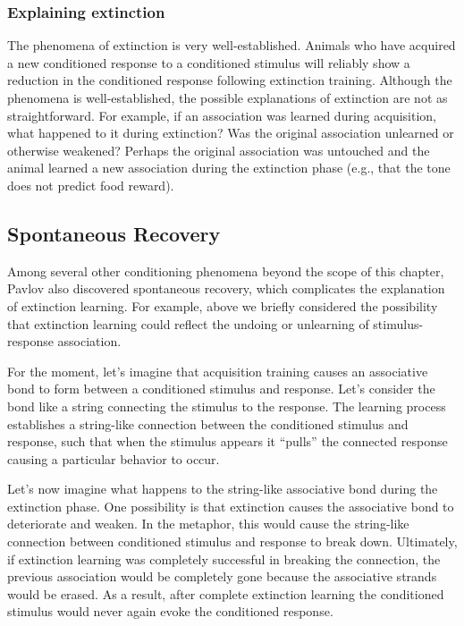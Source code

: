 \documentclass[
  oneside,
  12pt]{crumpbook}
\begin{document}
\hypertarget{explaining-extinction}{%
\subsubsection{Explaining extinction}\label{explaining-extinction}}

The phenomena of extinction is very well-established. Animals who have acquired a new conditioned response to a conditioned stimulus will reliably show a reduction in the conditioned response following extinction training. Although the phenomena is well-established, the possible explanations of extinction are not as straightforward. For example, if an association was learned during acquisition, what happened to it during extinction? Was the original association unlearned or otherwise weakened? Perhaps the original association was untouched and the animal learned a new association during the extinction phase (e.g., that the tone does not predict food reward).

\hypertarget{spontaneous-recovery}{%
\subsection{Spontaneous Recovery}\label{spontaneous-recovery}}

Among several other conditioning phenomena beyond the scope of this chapter, Pavlov also discovered spontaneous recovery, which complicates the explanation of extinction learning. For example, above we briefly considered the possibility that extinction learning could reflect the undoing or unlearning of stimulus-response association.

For the moment, let's imagine that acquisition training causes an associative bond to form between a conditioned stimulus and response. Let's consider the bond like a string connecting the stimulus to the response. The learning process establishes a string-like connection between the conditioned stimulus and response, such that when the stimulus appears it ``pulls'' the connected response causing a particular behavior to occur.

Let's now imagine what happens to the string-like associative bond during the extinction phase. One possibility is that extinction causes the associative bond to deteriorate and weaken. In the metaphor, this would cause the string-like connection between conditioned stimulus and response to break down. Ultimately, if extinction learning was completely successful in breaking the connection, the previous association would be completely gone because the associative strands would be erased. As a result, after complete extinction learning the conditioned stimulus would never again evoke the conditioned response.
\end{document}
